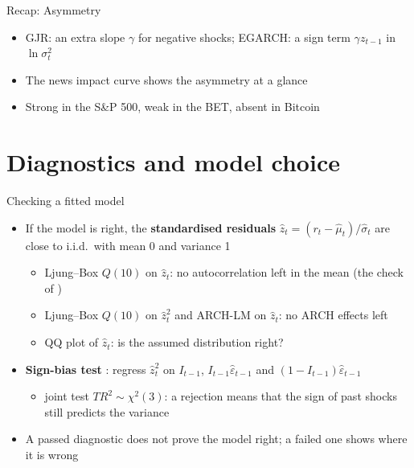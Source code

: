 \begin{frame}{Recap: Asymmetry}
\itemsize{\small}
\begin{itemize}
    \item GJR: an extra slope $\gamma$ for negative shocks; EGARCH: a sign term $\gamma z_{t-1}$ in $\ln\sigma_t^2$
    \item The news impact curve shows the asymmetry at a glance
    \item Strong in the S\&P 500, weak in the BET, absent in Bitcoin
\end{itemize}
\end{frame}


\section{Diagnostics and model choice}

\begin{frame}{Checking a fitted model}
\itemsize{\small}
\begin{itemize}
    \item If the model is right, the \textbf{standardised residuals} $\hat z_t = (r_t - \hat\mu_t)/\hat\sigma_t$ are close to i.i.d.\ with mean 0 and variance 1
    \begin{itemize}
        \item Ljung--Box $Q(10)$ on $\hat z_t$: no autocorrelation left in the mean (the check of )
        \item Ljung--Box $Q(10)$ on $\hat z_t^2$ and ARCH-LM on $\hat z_t$: no ARCH effects left
        \item QQ plot of $\hat z_t$: is the assumed distribution right?
    \end{itemize}
    \item \textbf{Sign-bias test} : regress $\hat z_t^2$ on $I_{t-1}$, $I_{t-1}\hat\varepsilon_{t-1}$ and $(1 - I_{t-1})\hat\varepsilon_{t-1}$
    \begin{itemize}
        \item joint test $T R^2 \sim \chi^2(3)$: a rejection means that the sign of past shocks still predicts the variance
    \end{itemize}
    \item A passed diagnostic does not prove the model right; a failed one shows where it is wrong
\end{itemize}
\end{frame}

